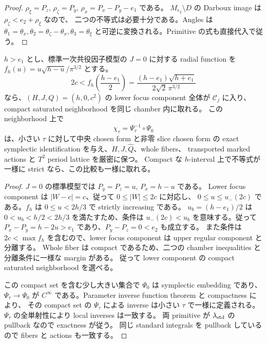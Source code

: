 \begin{proof}
$\rho_\xi=P_z$, $\rho_\zeta=P_y$, $\rho_x=P_x-P_y-e_1$ である。
$M_{e_2}\setminus D$ の Darboux image は $\rho_\zeta<e_2+\rho_\xi$ なので、
二つの不等式は必要十分である。Angles は
$\theta_1=\theta_x,\theta_2=\theta_\zeta-\theta_x,\theta_3=\theta_\xi$
と可逆に変換される。Primitive の式も直接代入で従う。
\end{proof}

\begin{theorem}\label{tp:focus-comparison}

$h>e_1$ とし、標準一次共役因子模型の $J=0$ に対する radial function を
$f_h(u)=u\sqrt{h-u}/\pi^{3/2}$ とする。
\begin{equation}\label{tp:containment}
 2c<f_h\left(\frac{h-e_1}{2}\right)
 =\frac{(h-e_1)\sqrt{h+e_1}}{2\sqrt2\,\pi^{3/2}}
\end{equation}
なら、$(H,J,Q)=(h,0,c^2)$ の lower focus component 全体が
$\mathcal C_j$ に入り、compact saturated neighborhood を同じ chamber 内に取れる。
この neighborhood 上で
\[
 \chi_\tau=\Psi_\tau^{-1}\circ\Psi_0
\]
は、小さい $\tau$ に対して中央 chosen form と非零 slice chosen form の
exact symplectic identification を与え、$H,J,\widehat Q$、whole fibers、
transported marked actions と $T^2$ period lattice を厳密に保つ。
Compact な $h$-interval 上で不等式が一様に strict なら、この比較も一様に取れる。
\end{theorem}

\begin{proof}
$J=0$ の標準模型では $P_y=P_z=u$, $P_x=h-u$ である。
Lower focus component は $|W-c|=c$、従って $0\le |W|\le2c$ に対応し、
$0\le u\le u_-(2c)$ である。$f_h$ は $0\le u<2h/3$ で strictly increasing である。
$u_b=(h-e_1)/2$ は $0<u_b<h/2<2h/3$ を満たすため、条件は
$u_-(2c)<u_b$ を意味する。従って
$P_x-P_y=h-2u>e_1$ であり、$P_y-P_z=0<e_2$ も成立する。
また条件は $2c<\max f_h$ を含むので、lower focus component は upper regular component と分離する。
Whole fiber は compact であるため、二つの chamber inequalities と分離条件に一様な margin がある。
従って lower component の compact saturated neighborhood を選べる。

この compact set を含む少し大きい集合で $\Psi_0$ は symplectic embedding であり、
$\Psi_\tau\to\Psi_0$ が $C^\infty$ である。Parameter inverse function theorem と compactness により、
その compact set の $\Psi_\tau$ による inverse は小さい $\tau$ で一様に定義される。
$\Psi_\tau$ の全単射性により local inverses は一致する。
両 primitive が $\lambda_{\rm std}$ の pullback なので exactness が従う。
同じ standard integrals を pullback しているので fibers と actions も一致する。
\end{proof}

